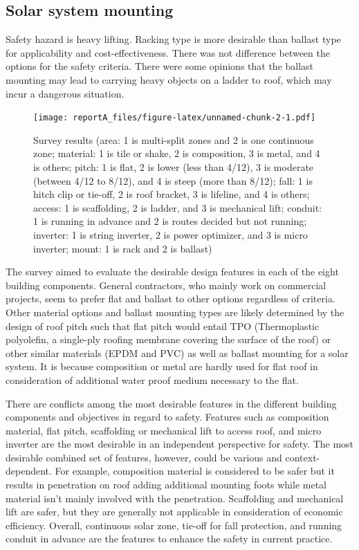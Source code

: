 \documentclass[]{article}
\begin{document}
\hypertarget{solar-system-mounting}{%
\subsection{Solar system mounting}\label{solar-system-mounting}}

Safety hazard is heavy lifting. Racking type is more desirable than
ballast type for applicability and cost-effectiveness. There was not
difference between the options for the safety criteria. There were some
opinions that the ballast mounting may lead to carrying heavy objects on
a ladder to roof, which may incur a dangerous situation.

\begin{figure}
\centering
\texttt{[image: reportA\_files/figure-latex/unnamed-chunk-2-1.pdf]}
\caption{Survey results (area: 1 is multi-split zones and 2 is one
continuous zone; material: 1 is tile or shake, 2 is composition, 3 is
metal, and 4 is others; pitch: 1 is flat, 2 is lower (less than 4/12), 3
is moderate (between 4/12 to 8/12), and 4 is steep (more than 8/12);
fall: 1 is hitch clip or tie-off, 2 is roof bracket, 3 is lifeline, and
4 is others; access: 1 is scaffolding, 2 is ladder, and 3 is mechanical
lift; conduit: 1 is running in advance and 2 is routes decided but not
running; inverter: 1 is string inverter, 2 is power optimizer, and 3 is
micro inverter; mount: 1 is rack and 2 is ballast)}
\end{figure}

The survey aimed to evaluate the desirable design features in each of
the eight building components. General contractors, who mainly work on
commercial projects, seem to prefer flat and ballast to other options
regardless of criteria. Other material options and ballast mounting
types are likely determined by the design of roof pitch such that flat
pitch would entail TPO (Thermoplastic polyolefin, a single-ply roofing
membrane covering the surface of the roof) or other similar materials
(EPDM and PVC) as well as ballast mounting for a solar system. It is
because composition or metal are hardly used for flat roof in
consideration of additional water proof medium necessary to the flat.

There are conflicts among the most desirable features in the different
building components and objectives in regard to safety. Features such as
composition material, flat pitch, scaffolding or mechanical lift to
access roof, and micro inverter are the most desirable in an independent
perspective for safety. The most desirable combined set of features,
however, could be various and context-dependent. For example,
composition material is considered to be safer but it results in
penetration on roof adding additional mounting foots while metal
material isn't mainly involved with the penetration. Scaffolding and
mechanical lift are safer, but they are generally not applicable in
consideration of economic efficiency. Overall, continuous solar zone,
tie-off for fall protection, and running conduit in advance are the
features to enhance the safety in current practice.
\end{document}
